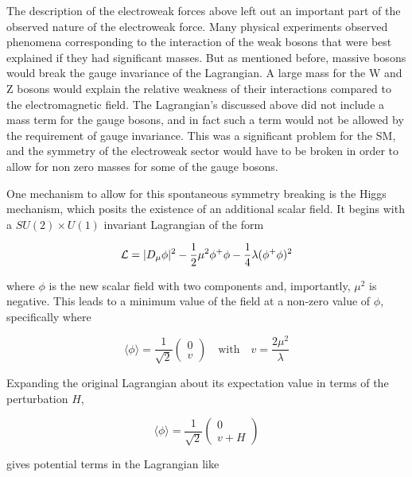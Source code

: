 The description of the electroweak forces above left out an important part of the observed nature of the electroweak force.
Many physical experiments observed phenomena corresponding to the interaction of the weak bosons that were best explained if they had significant masses.
But as mentioned before, massive bosons would break the gauge invariance of the Lagrangian.
A large mass for the W and Z bosons would explain the relative weakness of their interactions compared to the electromagnetic field.
The Lagrangian's discussed above did not include a mass term for the gauge bosons, and in fact such a term would not be allowed by the requirement of gauge invariance. 
This was a significant problem for the \ac{SM}, and the symmetry of the electroweak sector would have to be broken in order to allow for non zero masses for some of the gauge bosons.

One mechanism to allow for this spontaneous symmetry breaking is the Higgs mechanism, which posits the existence of an additional scalar field.
It begins with a $SU(2)\times U(1)$ invariant Lagrangian of the form 

\begin{equation}
  \mathcal{L} = |D_\mu\phi|^2 - \frac{1}{2}\mu^2\phi^+\phi - \frac{1}{4}\lambda(\phi^+\phi)^2
\end{equation}

\noindent where $\phi$ is the new scalar field with two components and, importantly, $\mu^2$ is negative.
This leads to a minimum value of the field at a non-zero value of $\phi$, specifically where

\begin{equation}
 \langle \phi \rangle = \frac{1}{\sqrt{2}} \begin{pmatrix}0\\v\end{pmatrix} \quad \mathrm{with} \quad v = \frac{2\mu^2}{\lambda}
\end{equation}

\noindent Expanding the original Lagrangian about its expectation value in terms of the perturbation $H$,

\begin{equation}
  \langle \phi \rangle = \frac{1}{\sqrt{2}} \begin{pmatrix}0\\v + H\end{pmatrix}
\end{equation}

\noindent gives potential terms in the Lagrangian like 

